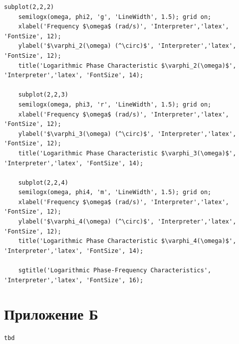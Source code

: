 \documentclass[a4paper, 12pt]{article}
\begin{document}
\begin{lstlisting}[label=task1, caption={Программа для задания 1}]
    subplot(2,2,2)
    semilogx(omega, phi2, 'g', 'LineWidth', 1.5); grid on;
    xlabel('Frequency $\omega$ (rad/s)', 'Interpreter','latex', 'FontSize', 12);
    ylabel('$\varphi_2(\omega) (^\circ)$', 'Interpreter','latex', 'FontSize', 12);
    title('Logarithmic Phase Characteristic $\varphi_2(\omega)$', 'Interpreter','latex', 'FontSize', 14);

    subplot(2,2,3)
    semilogx(omega, phi3, 'r', 'LineWidth', 1.5); grid on;
    xlabel('Frequency $\omega$ (rad/s)', 'Interpreter','latex', 'FontSize', 12);
    ylabel('$\varphi_3(\omega) (^\circ)$', 'Interpreter','latex', 'FontSize', 12);
    title('Logarithmic Phase Characteristic $\varphi_3(\omega)$', 'Interpreter','latex', 'FontSize', 14);

    subplot(2,2,4)
    semilogx(omega, phi4, 'm', 'LineWidth', 1.5); grid on;
    xlabel('Frequency $\omega$ (rad/s)', 'Interpreter','latex', 'FontSize', 12);
    ylabel('$\varphi_4(\omega) (^\circ)$', 'Interpreter','latex', 'FontSize', 12);
    title('Logarithmic Phase Characteristic $\varphi_4(\omega)$', 'Interpreter','latex', 'FontSize', 14);

    sgtitle('Logarithmic Phase-Frequency Characteristics', 'Interpreter','latex', 'FontSize', 16);
    \end{lstlisting}


    \section{Приложение Б}
    \begin{lstlisting}[label=task2, caption={Программа для задания 2}]
        tbd
    \end{lstlisting}
\end{document}
